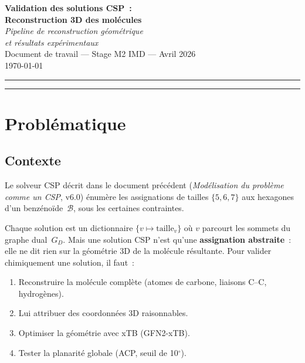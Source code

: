 \documentclass[12pt,a4paper]{article}
\theoremstyle{definition}
\theoremstyle{remark}
\newcommand{\B}{\mathcal{B}}
\newcommand{\GD}{G_{\!D}}
\begin{document}
\begin{center}
  {\LARGE\bfseries\color{bleuTitre}
    Validation des solutions CSP~:\\[4pt]
    Reconstruction 3D des mol\'ecules}\\[6pt]
  {\large\itshape
    Pipeline de reconstruction g\'eom\'etrique\\
    et r\'esultats exp\'erimentaux}\\[18pt]
  {\small Document de travail --- Stage M2 IMD --- Avril 2026}\\[4pt]
  {\small\color{gray}\today}
\end{center}

\vspace{8pt}
\rule{\linewidth}{1pt}
\vspace{4pt}

\tableofcontents

\vspace{10pt}
\rule{\linewidth}{0.4pt}


\section{Probl\'ematique}

\subsection{Contexte}

Le solveur CSP d\'ecrit dans le document pr\'ec\'edent
(\textit{Mod\'elisation du probl\`eme comme un CSP}, v6.0) \'enum\`ere
les assignations de tailles $\{5, 6, 7\}$ aux hexagones d'un
benz\'eno\"ide~$\B$, sous les certaines contraintes.

Chaque solution est un dictionnaire $\{v \mapsto \text{taille}_v\}$
o\`u $v$ parcourt les sommets du graphe dual~$\GD$. Mais une solution
CSP n'est qu'une \textbf{assignation abstraite}~: elle ne dit rien sur la
g\'eom\'etrie 3D de la mol\'ecule r\'esultante. Pour valider chimiquement
une solution, il faut~:
\begin{enumerate}[nosep]
  \item Reconstruire la mol\'ecule compl\`ete (atomes de carbone, liaisons C--C, hydrog\`enes).
  \item Lui attribuer des coordonn\'ees 3D raisonnables.
  \item Optimiser la g\'eom\'etrie avec xTB (GFN2-xTB).
  \item Tester la planarit\'e globale (ACP, seuil de 10$^\circ$).
\end{enumerate}
\end{document}
